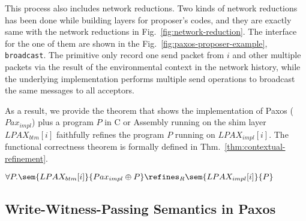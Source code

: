 This process also includes network reductions.
Two kinds of network reductions has been done while 
building layers for proposer's codes,
and they are exactly same with the network reductions in Fig.~\ref{fig:network-reduction}.
The interface for the one of them are shown in the Fig.~\ref{fig:paxos-proposer-example}, 
\texttt{broadcast}. 
The primitive only record one send packet from $i$ and other multiple packets via the result of the environmental context 
in the network history, while the underlying implementation performs multiple 
send operations to broadcast the same messages to all acceptors.

As a result, we provide the theorem 
that shows the implementation of Paxos ($Pax_{impl}$) plus a program $P$ in C or Assembly running on the shim layer $LPAX_{btm}[i]$ faithfully refines  the program $P$ running on $LPAX_{impl}[i]$.
The functional correctness theorem is formally defined in Thm.~\ref{thm:contextual-refinement}.

\begin{theorem}
\label{thm:contextual-refinement}

\noindent$\forall{}P.\sem{LPAX_{btm}[i]}{Pax_{impl} \oplus P} \refines_R \sem{LPAX_{impl}[i]}{P}$
\end{theorem}


\subsection{Write-Witness-Passing Semantics in Paxos}
\label{subsec:witness-passing-semantics-in-paxos}

